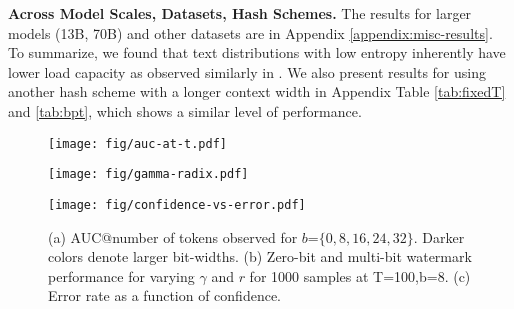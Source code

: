\noindent\textbf{Across Model Scales, Datasets, Hash Schemes.} The results for larger models (13B, 70B) and other datasets are in Appendix \ref{appendix:misc-results}. To summarize, we found that text distributions with low entropy inherently have lower load capacity as observed similarly in \citet{lee2023wrote, kirchenbauer2023reliability}. We also present results for using another hash scheme with a longer context width in Appendix Table \ref{tab:fixedT} and \ref{tab:bpt}, which shows a similar level of performance.




\begin{figure}
\begin{minipage}[t]{.32\textwidth}
    \centering
    \texttt{[image: fig/auc-at-t.pdf]}
    \subcaption{}\label{fig:detection}
\end{minipage}
\begin{minipage}[t]{.32\textwidth}
    \centering
    \texttt{[image: fig/gamma-radix.pdf]}
    \subcaption{}\label{fig:gamma-radix}
\end{minipage}
\begin{minipage}[t]{.32\textwidth}
    \centering
    \texttt{[image: fig/confidence-vs-error.pdf]}
    \subcaption{}\label{fig:confidence-vs-error}
\end{minipage}
\vspace{-1mm}
\caption{(a) AUC@number of tokens observed for $b$=$\{0,8,16,24,32\}$. Darker colors denote larger bit-widths. (b) Zero-bit and multi-bit watermark performance for varying $\gamma$ and $r$ for 1000 samples at T=100,b=8. (c) Error rate as a function of confidence.}
\vspace{-4mm}
\end{figure}


